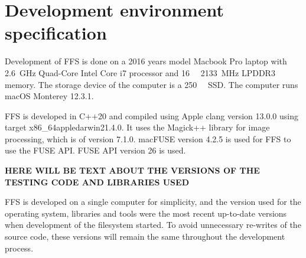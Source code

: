\section{Development environment specification}
\label{sec:dev_env}
Development of FFS is done on a 2016 years model Macbook Pro laptop with \SI{2.6}{\giga\hertz} Quad-Core Intel Core i7 processor and \SI{16}{\giga\byte} \SI{2133}{\mega\hertz} LPDDR3 memory. The storage device of the computer is a \SI{250}{\giga\byte} SSD. The computer runs macOS Monterey 12.3.1. 

FFS is developed in C++20 and compiled using Apple clang version 13.0.0 using target x86\_64\-apple\-darwin21.4.0. It uses the Magick++ library for image processing, which is of version 7.1.0. macFUSE version 4.2.5 is used for FFS to use the FUSE API. FUSE API version 26 is used.

\textbf{HERE WILL BE TEXT ABOUT THE VERSIONS OF THE TESTING CODE AND LIBRARIES USED}

FFS is developed on a single computer for simplicity, and the version used for the operating system, libraries and tools were the most recent up-to-date versions when development of the filesystem started. To avoid unnecessary re-writes of the source code, these versions will remain the same throughout the development process.